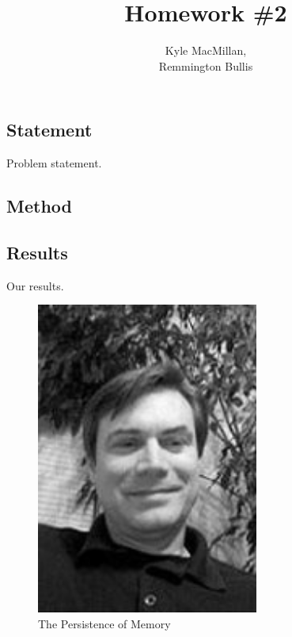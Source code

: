 \documentclass[12pt]{article}
\title{Homework \#2}
\author{Kyle MacMillan, \\Remmington Bullis}
\begin{document}
\maketitle


\section{} %

\subsection{Statement}
Problem statement.

\subsection{Method}


\newpage
\subsection{Results}
Our results.

\begin{figure}[H]
\centering
\noindent\includegraphics[width=0.65\textwidth]{./images/jmcgough}
\caption{The Persistence of Memory}
\label{fig:jmcgough}
\end{figure}
\end{document}
